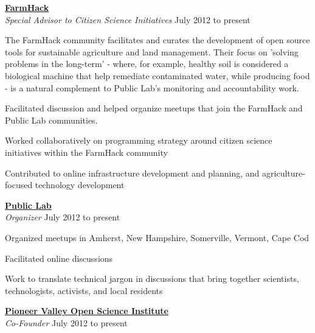 \documentclass[10pt]{article}
\newcommand{\blankline}{\quad\pagebreak[3]}
\newcommand{\halfblankline}{\quad\vspace{-0.5\baselineskip}\pagebreak[3]}
\begin{document}
\begin{minipage}{\textwidth}
\href{http://FarmHack.net}{\textbf{FarmHack}}  \\
\emph{Special Advisor to Citizen Science Initiatives} \hfill {July 2012 to present}

\halfblankline

The FarmHack community facilitates and curates the development of open source tools for sustainable agriculture and land management.  Their focus on 'solving problems in the long-term' - where, for example, healthy soil is considered a biological machine that help remediate contaminated water, while producing food - is a natural complement to Public Lab's monitoring and accountability work.
\begin{innerlist}
\item Facilitated discussion and helped organize meetups that join the FarmHack and Public Lab communities. 
\item Worked collaboratively on programming strategy around citizen science initiatives within the FarmHack community
\item Contributed to online infrastructure development and planning, and agriculture-focused technology development
\end{innerlist}
   


\blankline

\end{minipage}



\href{http://publiclab.org}{\textbf{Public Lab}}  \\
\emph{Organizer} \hfill {July 2012 to present}

\halfblankline
\begin{innerlist}
\item Organized meetups in Amherst, New Hampshire, Somerville, Vermont, Cape Cod
\item Facilitated online discussions
\item Work to translate technical jargon in discussions that bring together scientists, technologists, activists, and local residents
\end{innerlist}
   

\blankline

\href{http://pvos.org}{\textbf{Pioneer Valley Open Science Institute}}  \\
\emph{Co-Founder} \hfill {July 2012 to present}
\end{document}
